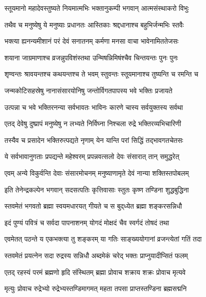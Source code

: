 \twolineshloka
{स्तूयमानो महादेवस्तुष्यते नियमात्मभिः}%
{भक्तानुकम्पी भगवान् आत्मसंस्थाकरो विभुः}


\twolineshloka
{तथैव च मनुष्येषु ये मनुष्याः प्रधानतः}%
{आस्तिकाः श्रद्दधानाश्च बहुभिर्जन्मभिः स्तवैः}


\twolineshloka
{भक्त्या ह्यनन्यमीशानं परं देवं सनातनम्}%
{कर्मणा मनसा वाचा भावेनामिततेजसः}


\twolineshloka
{शयाना जाग्रमाणाश्च व्रजन्नुपविशंस्तथा}%
{उन्मिषन्निमिषंश्चैव चिन्तयन्तः पुनः पुनः}

\twolineshloka
{शृण्वन्तः श्रावयन्तश्च कथयन्तश्च ते भवम्}%
{स्तुवन्तः स्तूयमानाश्च तुष्यन्ति च रमन्ति च}


\twolineshloka
{जन्मकोटिसहस्रेषु नानासंसारयोनिषु}%
{जन्तोर्विगतपापस्य भवे भक्तिः प्रजायते}


\twolineshloka
{उत्पन्ना च भवे भक्तिरनन्या सर्वभावतः}%
{भाविनः कारणे चास्य सर्वयुक्तस्य सर्वथा}


\twolineshloka
{एतद् देवेषु दुष्प्रापं मनुष्येषु न लभ्यते}%
{निर्विघ्ना निश्चला रुद्रे भक्तिरव्यभिचारिणी}

\twolineshloka
{तस्यैव च प्रसादेन भक्तिरुत्पद्यते नृणाम्}
{येन यान्ति परां सिद्धिं तद्भावगतचेतसः}%

\twolineshloka
{ये सर्वभावानुगताः प्रपद्यन्ते महेश्वरम्}
{प्रपन्नवत्सलो देवः संसारात् तान् समुद्धरेत्}%

\twolineshloka
{एवम् अन्ये विकुर्वन्ति देवाः संसारमोचनम्}
{मनुष्याणामृते देवं नान्या शक्तिस्तपोबलम्}%

\twolineshloka
{इति तेनेन्द्रकल्पेन भगवान् सदसत्पतिः}
{कृत्तिवासाः स्तुतः कृष्ण तण्डिना शुद्धबुद्धिना}%

\twolineshloka
{स्तवमेतं  भगवतो ब्रह्मा स्वयमधारयत्}
{गीयते च स बुद्‌ध्येत ब्रह्मा शङ्करसन्निधौ}%

\twolineshloka
{इदं पुण्यं पवित्रं च सर्वदा पापनाशनम्}
{योगदं मोक्षदं चैव स्वर्गदं तोषदं तथा}%

\twolineshloka
{एवमेतत् पठन्ते य एकभक्त्या तु शङ्करम्}
{या गतिः साङ्ख्ययोगानां व्रजन्त्येतां गतिं तदा}%

\twolineshloka
{स्तवमेतं प्रयत्नेन सदा रुद्रस्य सन्निधौ}
{अब्दमेकं चरेद् भक्तः प्राप्नुयादीप्सितं फलम्}%

\twolineshloka
{एतद् रहस्यं परमं ब्रह्मणो हृदि संस्थितम्}
{ब्रह्मा प्रोवाच शक्राय शक्रः प्रोवाच मृत्यवे}%

\twolineshloka
{मृत्युः प्रोवाच रुद्रेभ्यो रुद्रेभ्यस्तण्डिमागमत्}
{महता तपसा प्राप्तस्तण्डिना ब्रह्मसद्मनि}%

